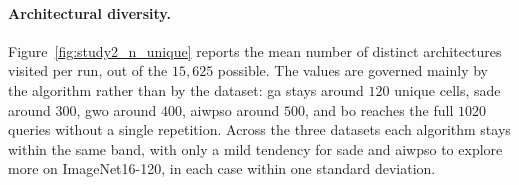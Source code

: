 \begin{table}[ht]
    \centering
    \caption{Cost of the best architecture selected by each algorithm in the accuracy-only formulation, as \#FLOPs (M) and \#Params (M), $\pm$ std over $N_{\mathrm{val}}=5$ seeds. A zero standard deviation, omitted here, indicates that every seed converged to the same architecture.}
    \label{tab:study2_arch_cost}
\end{table}

\paragraph{Architectural diversity.}
Figure~\ref{fig:study2_n_unique} reports the mean number of distinct architectures visited per run, out of the $15{,}625$ possible. The values are governed mainly by the algorithm rather than by the dataset: \acrshort{ga} stays around $120$ unique cells, \acrshort{sade} around $300$, \acrshort{gwo} around $400$, \acrshort{aiwpso} around $500$, and \acrshort{bo} reaches the full $1020$ queries without a single repetition. Across the three datasets each algorithm stays within the same band, with only a mild tendency for \acrshort{sade} and \acrshort{aiwpso} to explore more on ImageNet16-120, in each case within one standard deviation.

